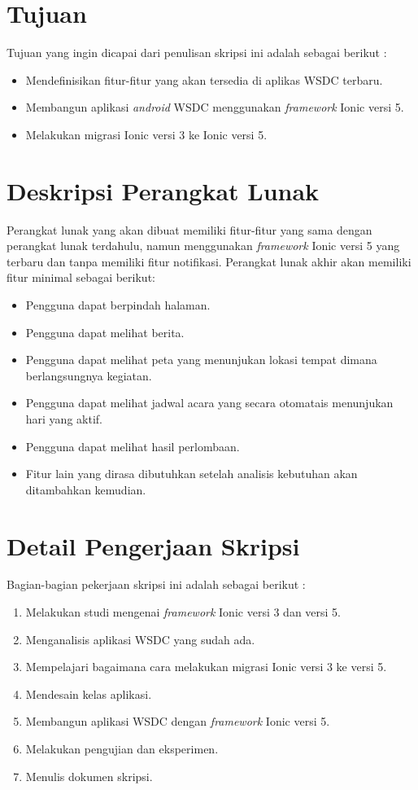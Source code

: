 \documentclass[a4paper,twoside]{article}
\begin{document}
\section{Tujuan}
Tujuan yang ingin dicapai dari penulisan skripsi ini adalah sebagai berikut :
\begin{itemize}
	\item Mendefinisikan fitur-fitur yang akan tersedia di aplikas WSDC terbaru.
	\item Membangun aplikasi {\it android} WSDC menggunakan {\it framework} Ionic versi 5.
	\item Melakukan migrasi Ionic versi 3 ke Ionic versi 5.
\end{itemize}

\section{Deskripsi Perangkat Lunak}
Perangkat lunak yang akan dibuat memiliki fitur-fitur yang sama dengan perangkat lunak terdahulu, namun menggunakan {\it framework} Ionic versi 5 yang terbaru dan tanpa memiliki fitur notifikasi. Perangkat lunak akhir akan memiliki fitur minimal sebagai berikut:
\begin{itemize}
	\item Pengguna dapat berpindah halaman.
	\item Pengguna dapat melihat berita.
	\item Pengguna dapat melihat peta yang menunjukan lokasi tempat dimana berlangsungnya kegiatan.
	\item Pengguna dapat melihat jadwal acara yang secara otomatais menunjukan hari yang aktif.
	\item Pengguna dapat melihat hasil perlombaan.
	\item Fitur lain yang dirasa dibutuhkan setelah analisis kebutuhan akan ditambahkan kemudian.
		
\end{itemize}

\section{Detail Pengerjaan Skripsi}
Bagian-bagian pekerjaan skripsi ini adalah sebagai berikut :
	\begin{enumerate}
		\item Melakukan studi mengenai {\it framework} Ionic versi 3 dan versi 5.
		\item Menganalisis aplikasi WSDC yang sudah ada.
		\item Mempelajari bagaimana cara melakukan migrasi Ionic versi 3 ke versi 5.
		\item Mendesain kelas aplikasi.
		\item Membangun aplikasi WSDC dengan {\it framework} Ionic versi 5. 
		\item Melakukan pengujian dan eksperimen.
		\item Menulis dokumen skripsi.
	\end{enumerate}
\end{document}
